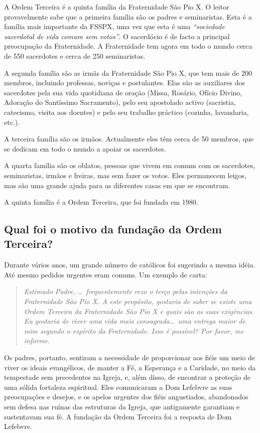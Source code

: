 \documentclass[11pt]{article}
\begin{document}
A Ordem Terceira é a quinta família da Fraternidade São Pio X\@.
O leitor provavelmente sabe que a primeira família são os padres e seminaristas.
Esta é a família mais importante da FSSPX, uma vez que esta é uma \textit{``sociedade sacerdotal de vida comum sem votos''}.
O sacerdócio é de facto a principal preocupação da Fraternidade.
A Fraternidade tem agora em todo o mundo cerca de 550 sacerdotes e cerca de 250 seminaristas.

A segunda família são as irmãs da Fraternidade São Pio X, que tem mais de 200 membros, incluindo professas, noviças e postulantes.
Elas são as auxiliares dos sacerdotes pela sua vida quotidiana de oração (Missa, Rosário, Ofício Divino, Adoração do Santíssimo Sacramento), pelo seu apostolado activo (sacristia, catecismo, visita aos doentes) e pelo seu trabalho práctico (cozinha, lavandaria, etc.).

A terceira família são os irmãos. 
Actualmente eles têm cerca de 50 membros, que se dedicam em todo o mundo a apoiar os sacerdotes.

A quarta família são os oblatos, pessoas que vivem em comum com os sacerdotes, seminaristas, irmãos e freiras, mas sem fazer os votos.
Eles permanecem leigos, mas são uma grande ajuda para as diferentes casas em que se encontram.

A quinta família é a Ordem Terceira, que foi fundada em 1980.

\subsection{Qual foi o motivo da fundação da Ordem Terceira?}\label{subsec:qual-foi-o-motivo-da-fundação-da-ordem-terceira?}

Durante vários anos, um grande número de católicos foi sugerindo a mesma idéia.
Até mesmo pedidos urgentes eram comuns.
Um exemplo de carta:

\begin{quote}\textit{Estimado Padre, \ldots\ frequentemente rezo o terço pelas intenções da Fraternidade São Pio X.
A este propósito, gostaria de saber se existe uma Ordem Terceira da Fraternidade São Pio X e quais são as suas exigências.
Eu gostaria de viver uma vida mais consagrada\ldots\ uma entrega maior de mim segundo o espírito da Fraternidade.
Isso é possível?
Por favor, me informe.}\end{quote}

Os padres, portanto, sentiram a necessidade de proporcionar aos fiéis um meio de viver os ideais evangélicos, de manter a Fé, a Esperança e a Caridade, no meio da tempestade sem precedentes na Igreja, e, além disso, de encontrar a proteção de uma sólida fortaleza espiritual.
Eles comunicaram a Dom Lefebvre as suas preocupações e desejos, e os apelos urgentes dos fiéis angustiados, abandonados sem defesa nas ruínas das estruturas da Igreja, que antigamente garantiam e sustentavam sua fé.
A fundação da Ordem Terceira foi a resposta de Dom Lefebvre.
\end{document}
